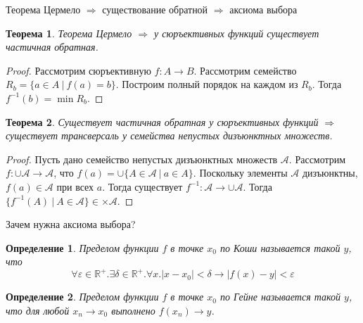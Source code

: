 \documentclass[aspectratio=169]{beamer}
\newtheorem{thm}{Теорема}[section]
\newtheorem{dfn}{Определение}[section]
\begin{document}
\begin{frame}{Теорема Цермело $\Rightarrow$ существование обратной $\Rightarrow$ аксиома выбора}
\begin{thm}Теорема Цермело $\Rightarrow$ у сюръективных функций существует частичная обратная.\end{thm}
\begin{proof}
Рассмотрим сюръективную $f: A \rightarrow B$. Рассмотрим семейство $R_b = \{ a \in A\ |\ f(a) = b \}$.
Построим полный порядок на каждом из $R_b$. Тогда $f^{-1}(b) = \min R_b$.
\end{proof}
\begin{thm}Существует частичная обратная у сюръективных функций $\Rightarrow$ существует трансверсаль у семейства непустых дизъюнктных множеств.\end{thm}
\begin{proof}
Пусть дано семейство непустых дизъюнктных множеств $\mathcal{A}$. 
Рассмотрим $f: \cup \mathcal{A} \rightarrow \mathcal{A}$, что
$f(a) = \cup\{ A \in \mathcal{A}\ |\ a \in A \}$. Поскольку элементы $\mathcal{A}$ дизъюнктны,
$f(a) \in \mathcal{A}$ при всех $a$. Тогда существует $f^{-1}: \mathcal{A} \rightarrow \cup\mathcal{A}$. Тогда 
$\{ f^{-1}(A)\ |\ A\in\mathcal{A} \} \in \times \mathcal{A}$.
\end{proof}
\end{frame}

\begin{frame}{Зачем нужна аксиома выбора?}
\begin{dfn}Пределом функции $f$ в точке $x_0$ по \emph{Коши} называется такой $y$, что
$$\forall \varepsilon\in\mathbb{R}^+.\exists \delta\in\mathbb{R}^+.\forall x.|x-x_0| < \delta \rightarrow |f(x) - y| < \varepsilon$$
\end{dfn}

\vspace{-0.5cm}
\begin{dfn}Пределом функции $f$ в точке $x_0$ по \emph{Гейне} называется такой $y$, что
для любой $x_n \rightarrow x_0$ выполнено $f(x_n) \rightarrow y$.
\end{dfn}
\end{frame}
\end{document}
